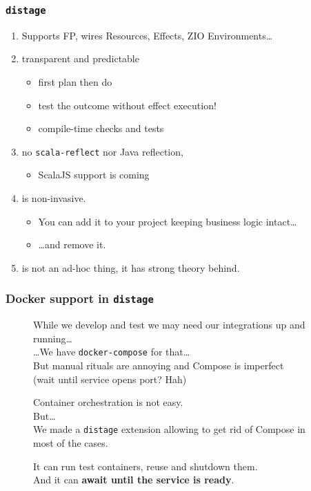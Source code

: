\documentclass[usenames,dvipsnames,aspectratio=169]{beamer}
\newcommand{\distage}{\texttt{distage}\xspace}
\begin{document}
\begin{frame}
  \frametitle{\distage}
  \begin{enumerate}
    \item Supports FP, wires Resources, Effects, ZIO Environments\dots
    \item transparent and predictable
      \begin{itemize}
        \item first plan then do
        \item test the outcome without effect execution!
        \item compile-time checks and tests
      \end{itemize}
    \item no \texttt{scala-reflect} nor Java reflection\footnotemark[1],
      \begin{itemize}
        \item ScalaJS support is coming
      \end{itemize}
    \item is non-invasive.
      \begin{itemize}
        \item You can add it to your project keeping business logic intact\dots
        \item \dots and remove it.
      \end{itemize}
    \item is not an ad-hoc thing, it has strong theory behind.
  \end{enumerate}
\end{frame}

\begin{frame}
  \frametitle{Docker support in \distage}

  \begin{figure}
    While we develop and test we may need our integrations up and running\dots \\
    \dots We have \texttt{docker-compose} for that\dots \\
    But manual rituals are annoying and Compose is imperfect \\
    (wait until service opens port? Hah)
  \end{figure}

  \begin{figure}
    Container orchestration is not easy. \\
    But\dots \\
    We made a \distage extension allowing to get rid of Compose in most of the cases.
  \end{figure}

  \begin{figure}
    It can run test containers, reuse and shutdown them. \\
    And it can \textbf{await until the service is ready}.
  \end{figure}

\end{frame}
\end{document}

